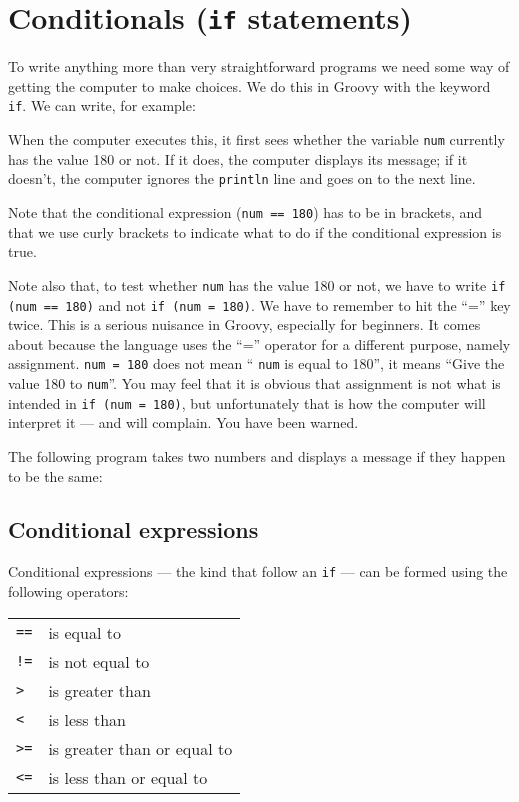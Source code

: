 \section{Conditionals (\texttt{if} statements)}

To write anything more than very straightforward programs we need some way
of getting the computer to make choices.
We do this in Groovy with the keyword \verb!if!.
We can write, for example:


When the computer executes this, it first sees whether the variable \verb!num!
currently has the value 180 or not.  If it does, the computer displays
its message; if it doesn't, the computer ignores the  \verb!println! line
and goes on to the next line.

Note that the conditional expression (\verb!num == 180!) has to be
in brackets, and that we use curly brackets to indicate what to do if
the conditional expression is true. 

Note also that, to test whether  \verb!num! has the value 180
or not, we have to write \verb!if (num == 180)! and not \verb!if (num = 180)!.
We have to remember to hit the ``='' key twice.
This is a serious nuisance in Groovy, especially for beginners.
It comes about because the language uses the ``='' operator for a different
purpose, namely assignment.  \verb!num = 180! does not mean `` \verb!num! is
equal to 180'', it means ``Give the value 180 to  \verb!num!''.  You may feel
that it is obvious that assignment is not what is intended in
\verb!if (num = 180)!, but unfortunately that is
how the computer will interpret it --- and will complain.
You have been warned.

The following program takes two numbers and displays a message if they happen
to be the same:


\subsection{Conditional expressions}
\label{sec:cond-expr}

Conditional expressions --- the kind that follow an \verb!if! ---
can be formed using the following operators:

\begin{tabular}{ll}
\verb+==+ &is equal to\\
\verb+!=+ &is not equal to\\
\verb+>+ &is greater than\\
\verb+<+ &is less than\\
\verb+>=+ & is greater than or equal to\\
\verb+<=+ &is less than or equal to\\
\end{tabular}

